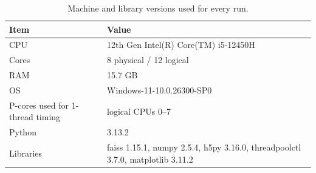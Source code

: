 \begin{table}[t]
\centering
\small
\caption{Machine and library versions used for every run.}
\label{tab:t0_machine}
\begin{tabular}{ll}
\toprule
Item & Value \\
\midrule
CPU & 12th Gen Intel(R) Core(TM) i5-12450H \\
Cores & 8 physical / 12 logical \\
RAM & 15.7 GB \\
OS & Windows-11-10.0.26300-SP0 \\
P-cores used for 1-thread timing & logical CPUs 0--7 \\
Python & 3.13.2 \\
Libraries & faiss 1.15.1, numpy 2.5.4, h5py 3.16.0, threadpoolctl 3.7.0, matplotlib 3.11.2 \\
\bottomrule
\end{tabular}
\end{table}
